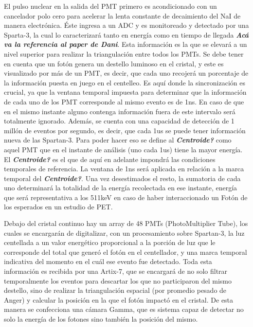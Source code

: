 \documentclass[conference]{IEEEtran}
\begin{document}
El pulso nuclear en la salida del PMT primero es acondicionado con un cancelador polo cero para acelerar la lenta constante de decaimiento del NaI de manera electrónica. Éste ingresa a un ADC y es monitoreado y detectado por una Sparta-3, la cual lo caracterizará tanto en energía como en tiempo de llegada \textit{\textbf{Acá va la referencia al paper de Dani}}. Esta información es la que se elevará a un nivel superior para realizar la triangulación entre todos los PMTs.
Se debe tener en cuenta que un fotón genera un destello luminoso en el cristal, y este es visualizado por más de un PMT, es decir, que cada uno recojerá un porcentaje de la información puesta en juego en el centelleo.
Es aquí donde la sincronización es crucial, ya que la ventana temporal impuesta para determinar que la información de cada uno de los PMT corresponde al mismo evento es de 1ns. En caso de que en el mismo instante alguno contenga información fuera de este intervalo será totalmente ignorado.
Además, se cuenta con una capacidad de detección de 1 millón de eventos por segundo, es decir, que cada 1us se puede tener información nueva de las Spartan-3.
Para poder hacer eso se define al \textit{\textbf{Centroide?}} como aquel PMT que en el instante de análisis (uno cada 1us) tiene la mayor energía. El \textit{\textbf{Centroide?}} es el que de aquí en adelante impondrá las condiciones temporales de referencia. La ventana de 1ns será aplicada en relación a la marca temporal del \textit{\textbf{Centroide?}}.
Una vez desestimados el resto, la sumatoria de cada uno determinará la totalidad de la energía recolectada en ese instante, energía que será representativa a los 511keV en caso de haber interaccionado un Fotón de los esperados en un estudio de PET.

Debajo del cristal continuo hay un array de 48 PMTs (PhotoMultiplier Tube), los cuales se encargarán de digitalizar, con un procesamiento sobre Spartan-3, la luz centellada a un valor energético proporcional a la porción de luz que le corresponde del total que generó el fotón en el centellador, y una marca temporal indicativa del momento en el cuál ese evento fue detectado. Toda esta información es recibida por una Artix-7, que se encargará de no solo filtrar temporalmente los eventos para descartar los que no participaron del mismo destello, sino de realizar la triangulación espacial (por promedio pesado de Anger\citep{Anger}) y calcular la posición en la que el fotón impactó en el cristal. De esta manera se confecciona una cámara Gamma, que es sistema capaz de detectar no solo la energía de los fotones sino también la posición del mismo.
\end{document}
